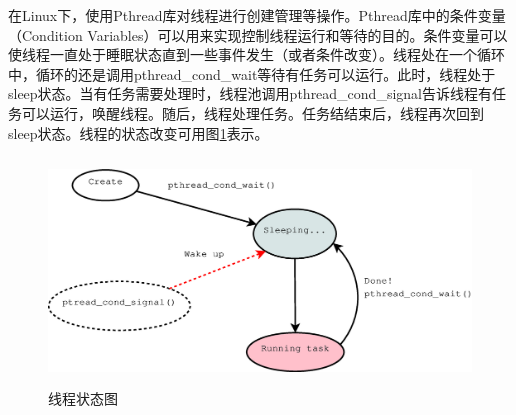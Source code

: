 \documentclass[twoside, xetex]{report}
\begin{document}
	在Linux下，使用Pthread库对线程进行创建管理等操作。Pthread库中的条件变量（Condition Variables）可以用来实现控制线程运行和等待的目的。条件变量可以使线程一直处于睡眠状态直到一些事件发生（或者条件改变）。线程处在一个循环中，循环的还是调用pthread\_cond\_wait等待有任务可以运行。此时，线程处于sleep状态。当有任务需要处理时，线程池调用pthread\_cond\_signal告诉线程有任务可以运行，唤醒线程。随后，线程处理任务。任务结结束后，线程再次回到sleep状态。线程的状态改变可用图\ref{tpthread}表示。
	
	\begin{figure}[htbp]
	\centering
	\includegraphics[height=6cm, width=13cm]{pics/tpthread.eps}
	\caption{线程状态图}
	\label{tpthread}
	\end{figure}
	
\end{document}
